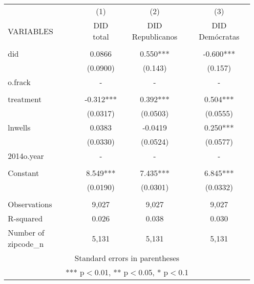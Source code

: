 \begin{tabular}{lccc} \hline
 & (1) & (2) & (3) \\
VARIABLES & DID total & DID Republicanos & DID Demócratas \\ \hline
 &  &  &  \\
did & 0.0866 & 0.550*** & -0.600*** \\
 & (0.0900) & (0.143) & (0.157) \\
o.frack & - & - & - \\
 &  &  &  \\
treatment & -0.312*** & 0.392*** & 0.504*** \\
 & (0.0317) & (0.0503) & (0.0555) \\
lnwells & 0.0383 & -0.0419 & 0.250*** \\
 & (0.0330) & (0.0524) & (0.0577) \\
2014o.year & - & - & - \\
 &  &  &  \\
Constant & 8.549*** & 7.435*** & 6.845*** \\
 & (0.0190) & (0.0301) & (0.0332) \\
 &  &  &  \\
Observations & 9,027 & 9,027 & 9,027 \\
R-squared & 0.026 & 0.038 & 0.030 \\
 Number of zipcode\_n & 5,131 & 5,131 & 5,131 \\ \hline
\multicolumn{4}{c}{ Standard errors in parentheses} \\
\multicolumn{4}{c}{ *** p$<$0.01, ** p$<$0.05, * p$<$0.1} \\
\end{tabular}
